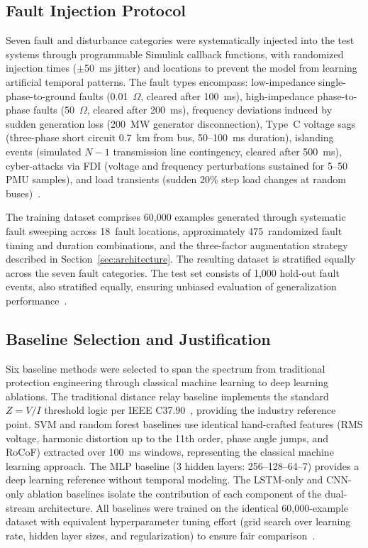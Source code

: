 \documentclass[journal]{IEEEtran}
\begin{document}
\subsection{Fault Injection Protocol}

Seven fault and disturbance categories were systematically injected into the test systems through programmable Simulink callback functions, with randomized injection times ($\pm$50~ms jitter) and locations to prevent the model from learning artificial temporal patterns. The fault types encompass: low-impedance single-phase-to-ground faults (0.01~$\Omega$, cleared after 100~ms), high-impedance phase-to-phase faults (50~$\Omega$, cleared after 200~ms), frequency deviations induced by sudden generation loss (200~MW generator disconnection), Type~C voltage sags (three-phase short circuit 0.7~km from bus, 50--100~ms duration), islanding events (simulated $N-1$ transmission line contingency, cleared after 500~ms), cyber-attacks via FDI (voltage and frequency perturbations sustained for 5--50 PMU samples), and load transients (sudden 20\% step load changes at random buses)~\cite{ref34}.

The training dataset comprises 60,000 examples generated through systematic fault sweeping across 18~fault locations, approximately 475~randomized fault timing and duration combinations, and the three-factor augmentation strategy described in Section~\ref{sec:architecture}. The resulting dataset is stratified equally across the seven fault categories. The test set consists of 1,000 hold-out fault events, also stratified equally, ensuring unbiased evaluation of generalization performance~\cite{ref27}.

\subsection{Baseline Selection and Justification}

Six baseline methods were selected to span the spectrum from traditional protection engineering through classical machine learning to deep learning ablations. The traditional distance relay baseline implements the standard $Z = V/I$ threshold logic per IEEE C37.90~\cite{ref3}, providing the industry reference point. SVM and random forest baselines use identical hand-crafted features (RMS voltage, harmonic distortion up to the 11th order, phase angle jumps, and RoCoF) extracted over 100~ms windows, representing the classical machine learning approach. The MLP baseline (3 hidden layers: 256--128--64--7) provides a deep learning reference without temporal modeling. The LSTM-only and CNN-only ablation baselines isolate the contribution of each component of the dual-stream architecture. All baselines were trained on the identical 60,000-example dataset with equivalent hyperparameter tuning effort (grid search over learning rate, hidden layer sizes, and regularization) to ensure fair comparison~\cite{ref35}.
\end{document}
